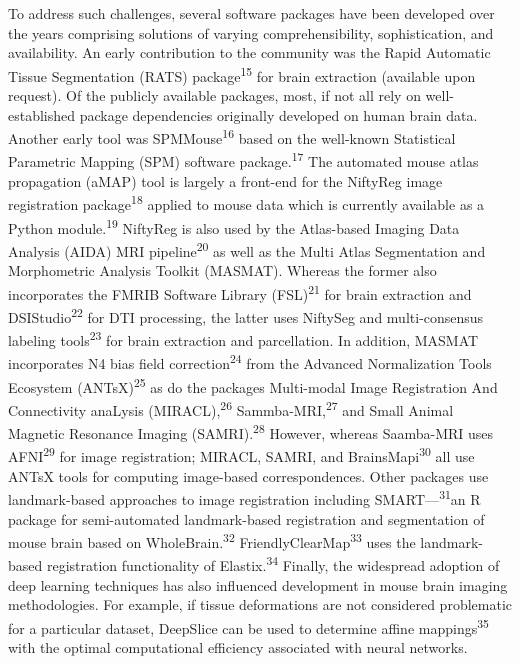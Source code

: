 \documentclass[
  12pt,
]{article}
\begin{document}
To address such challenges, several software packages have been
developed over the years comprising solutions of varying
comprehensibility, sophistication, and availability. An early
contribution to the community was the Rapid Automatic Tissue
Segmentation (RATS) package\textsuperscript{15} for brain extraction
(available upon request). Of the publicly available packages, most, if
not all rely on well-established package dependencies originally
developed on human brain data. Another early tool was
SPMMouse\textsuperscript{16} based on the well-known Statistical
Parametric Mapping (SPM) software package.\textsuperscript{17} The
automated mouse atlas propagation (aMAP) tool is largely a front-end for
the NiftyReg image registration package\textsuperscript{18} applied to
mouse data which is currently available as a Python
module.\textsuperscript{19} NiftyReg is also used by the Atlas-based
Imaging Data Analysis (AIDA) MRI pipeline\textsuperscript{20} as well as
the Multi Atlas Segmentation and Morphometric Analysis Toolkit (MASMAT).
Whereas the former also incorporates the FMRIB Software Library
(FSL)\textsuperscript{21} for brain extraction and
DSIStudio\textsuperscript{22} for DTI processing, the latter uses
NiftySeg and multi-consensus labeling tools\textsuperscript{23} for
brain extraction and parcellation. In addition, MASMAT incorporates N4
bias field correction\textsuperscript{24} from the Advanced
Normalization Tools Ecosystem (ANTsX)\textsuperscript{25} as do the
packages Multi-modal Image Registration And Connectivity anaLysis
(MIRACL),\textsuperscript{26} Sammba-MRI,\textsuperscript{27} and Small
Animal Magnetic Resonance Imaging (SAMRI).\textsuperscript{28} However,
whereas Saamba-MRI uses AFNI\textsuperscript{29} for image registration;
MIRACL, SAMRI, and BrainsMapi\textsuperscript{30} all use ANTsX tools
for computing image-based correspondences. Other packages use
landmark-based approaches to image registration including
SMART---\textsuperscript{31}an R package for semi-automated
landmark-based registration and segmentation of mouse brain based on
WholeBrain.\textsuperscript{32} FriendlyClearMap\textsuperscript{33}
uses the landmark-based registration functionality of
Elastix.\textsuperscript{34} Finally, the widespread adoption of deep
learning techniques has also influenced development in mouse brain
imaging methodologies. For example, if tissue deformations are not
considered problematic for a particular dataset, DeepSlice can be used
to determine affine mappings\textsuperscript{35} with the optimal
computational efficiency associated with neural networks.
\end{document}

